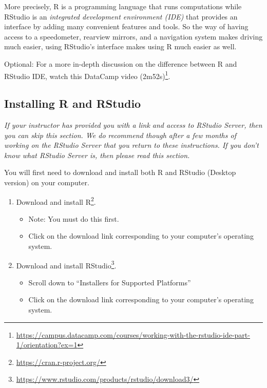 \documentclass[12pt,]{krantz}
\providecommand{\tightlist}{%
  \setlength{\itemsep}{0pt}\setlength{\parskip}{0pt}}
\renewcommand{\href}[2]{#2\footnote{\url{#1}}}
\begin{document}
More precisely, R is a programming language that runs computations while
RStudio is an \emph{integrated development environment (IDE)} that
provides an interface by adding many convenient features and tools. So
the way of having access to a speedometer, rearview mirrors, and a
navigation system makes driving much easier, using RStudio's interface
makes using R much easier as well.

Optional: For a more in-depth discussion on the difference between R and
RStudio IDE, watch this
\href{https://campus.datacamp.com/courses/working-with-the-rstudio-ide-part-1/orientation?ex=1}{DataCamp
video (2m52s)}.

\subsection{Installing R and RStudio}\label{installing-r-and-rstudio}

\emph{If your instructor has provided you with a link and access to
RStudio Server, then you can skip this section. We do recommend though
after a few months of working on the RStudio Server that you return to
these instructions. If you don't know what RStudio Server is, then
please read this section.}

You will first need to download and install both R and RStudio (Desktop
version) on your computer.

\begin{enumerate}
\def\labelenumi{\arabic{enumi}.}
\tightlist
\item
  \href{https://cran.r-project.org/}{Download and install R}.

  \begin{itemize}
  \tightlist
  \item
    Note: You must do this first.
  \item
    Click on the download link corresponding to your computer's
    operating system.
  \end{itemize}
\item
  \href{https://www.rstudio.com/products/rstudio/download3/}{Download
  and install RStudio}.

  \begin{itemize}
  \tightlist
  \item
    Scroll down to ``Installers for Supported Platforms''
  \item
    Click on the download link corresponding to your computer's
    operating system.
  \end{itemize}
\end{enumerate}
\end{document}
